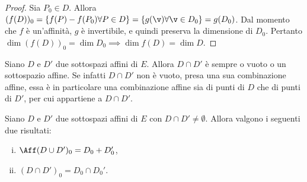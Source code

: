 \documentclass[11pt]{article}
\begin{document}
	\begin{proof}
		Sia $P_0 \in D$. Allora $(f(D))_0 = \{ f(P) - f(P_0) \forall P \in D \} = \{ g(\v) \forall \v \in D_0 \} =
		g(D_0)$. Dal momento che $f$ è un'affinità, $g$ è invertibile, e quindi preserva la dimensione di $D_0$.
		Pertanto $\dim (f(D))_0 = \dim D_0 \implies \dim f(D) = \dim D$.
	\end{proof}
	
	\begin{remark}
		Siano $D$ e $D'$ due sottospazi affini di $E$. Allora $D \cap D'$ è sempre o vuoto o un sottospazio
		affine. Se infatti $D \cap D'$ non è vuoto, presa una sua combinazione affine, essa è in particolare
		una combinazione affine sia di punti di $D$ che di punti di $D'$, per cui appartiene a $D \cap D'$.
	\end{remark}
	
	\begin{proposition}
		Siano $D$ e $D'$ due sottospazi affini di $E$ con $D \cap D' \neq \emptyset$. Allora
		valgono i seguenti due risultati:
		
		\begin{enumerate}[(i)]
			\item $\Aff(D \cup D')_0 = D_0 + D'_0$,
			\item $(D \cap D')_0 = D_0 \cap D_0'$.
		\end{enumerate}
	\end{proposition}
	
\end{document}
